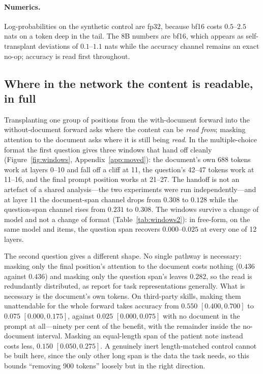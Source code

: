 \documentclass{article}
\begin{document}
\paragraph{Numerics.} Log-probabilities on the synthetic control are fp32,
because bf16 costs $0.5$--$2.5$ nats on a token deep in the tail. The 8B numbers
are bf16, which appears as self-transplant deviations of $0.1$--$1.1$ nats while
the accuracy channel remains an exact no-op; accuracy is read first throughout.




\subsection{Where in the network the content is readable, in full}
\label{app:where}

Transplanting one group of positions from the with-document forward into the
without-document forward asks where the content can be \emph{read from}; masking
attention to the document asks where it is still being \emph{read}. In the
multiple-choice format the first question gives three windows that hand off
cleanly (Figure~\ref{fig:windows}, Appendix~\ref{app:moved}): the document's own
688 tokens work at layers 0--10 and fall off a cliff at 11, the question's 42--47
tokens work at 11--16, and the final prompt position works at 21--27. The handoff
is not an artefact of a shared analysis---the two experiments were run
independently---and at layer 11 the document-span channel drops from $0.308$ to
$0.128$ while the question-span channel rises from $0.231$ to $0.308$. The
windows survive a change of model and not a change of format
(Table~\ref{tab:windows2}): in free-form, on the same model and items, the
question span recovers $0.000$--$0.025$ at every one of 12 layers.

The second question gives a different shape. No single pathway is necessary:
masking only the final position's attention to the document costs nothing
($0.436$ against $0.436$) and masking only the question span's leaves $0.282$,
so the read is redundantly distributed, as \citet{jit2025taskrepr} report for
task representations generally. What is necessary is the document's own tokens.
On third-party skills, making them unattendable for the whole forward takes
accuracy from $0.550$ $[0.400, 0.700]$ to $0.075$ $[0.000, 0.175]$, against
$0.025$ $[0.000, 0.075]$ with no document in the prompt at all---ninety per cent
of the benefit, with the remainder inside the no-document interval. Masking an
equal-length span of the patient note instead costs less, $0.150$
$[0.050, 0.275]$. A genuinely inert length-matched control cannot be built here,
since the only other long span is the data the task needs, so this bounds
``removing 900 tokens'' loosely but in the right direction.
\end{document}
